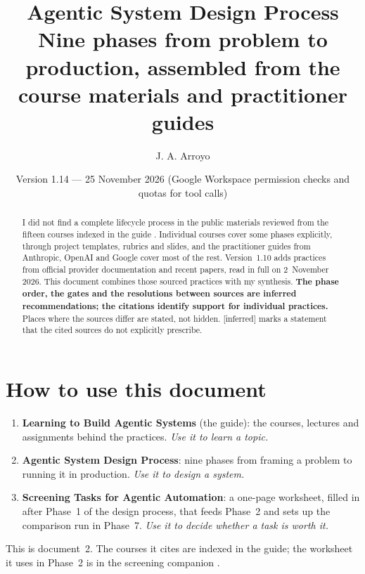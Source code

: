 \documentclass[10pt]{article}
\title{\textbf{Agentic System Design Process}\\[4pt]
\large Nine phases from problem to production, assembled from the course materials and practitioner guides}
\author{J. A. Arroyo}
\date{Version 1.14 --- 25 November 2026 (Google Workspace permission checks and quotas for tool calls)}
\newcommand{\inferred}{\textsf{\small[inferred]}}
\begin{document}
\maketitle

\begin{abstract}
\noindent I did not find a complete lifecycle process in the public materials reviewed from the fifteen courses indexed in the guide \cite{guide}.
Individual courses cover some phases explicitly, through project templates, rubrics and slides, and the practitioner guides from Anthropic, OpenAI and Google cover most of the rest.
Version~1.10 adds practices from official provider documentation and recent papers, read in full on 2~November 2026.
This document combines those sourced practices with my synthesis.
\textbf{The phase order, the gates and the resolutions between sources are inferred recommendations; the citations identify support for individual practices.}
Places where the sources differ are stated, not hidden.
\inferred{} marks a statement that the cited sources do not explicitly prescribe.
\end{abstract}

\tableofcontents

\section*{How to use this document}

\begin{tcolorbox}[colback=black!3,colframe=black!35,boxrule=0.4pt,arc=1pt,left=4pt,right=4pt,top=2pt,bottom=2pt,title={One set of three documents},fonttitle=\sffamily\bfseries\small]
\small
\begin{enumerate}[leftmargin=1.4em,itemsep=0pt]
\item \textbf{Learning to Build Agentic Systems} (the guide): the courses, lectures and assignments behind the practices. \emph{Use it to learn a topic.}
\item \textbf{Agentic System Design Process}: nine phases from framing a problem to running it in production. \emph{Use it to design a system.}
\item \textbf{Screening Tasks for Agentic Automation}: a one-page worksheet, filled in after Phase~1 of the design process, that feeds Phase~2 and sets up the comparison run in Phase~7. \emph{Use it to decide whether a task is worth it.}
\end{enumerate}
This is document~2. The courses it cites are indexed in the guide; the worksheet it uses in Phase~2 is in the screening companion \cite{screen}.
\end{tcolorbox}
\end{document}
